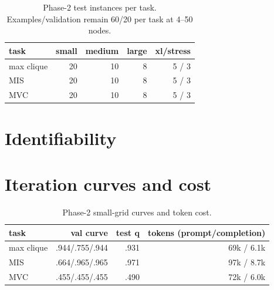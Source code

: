 \documentclass[10pt]{article}
\begin{document}
\begin{table}[H]
\centering
\small

\caption{Phase-1 splits.}
\end{table}

\begin{table}[H]
\centering
\small
\begin{tabular}{lrrrr}
\toprule
task & small & medium & large & xl/stress \\
\midrule
max clique & 20 & 10 & 8 & 5 / 3 \\
MIS & 20 & 10 & 8 & 5 / 3 \\
MVC & 20 & 10 & 8 & 5 / 3 \\
\bottomrule
\end{tabular}
\caption{Phase-2 test instances per task. Examples/validation remain 60/20
per task at 4--50 nodes.}
\end{table}

\section{Identifiability}
\begin{table}[H]
\centering
\small

\caption{Probability that the true task is the unique survivor among 10 tasks
and 37 distractors (400 trials).}
\end{table}

\section{Iteration curves and cost}
\begin{table}[H]
\centering
\small
\begin{tabular}{lrrr}
\toprule
task & val curve & test q & tokens (prompt/completion) \\
\midrule
max clique & .944/.755/.944 & .931 & 69k / 6.1k \\
MIS & .664/.965/.965 & .971 & 97k / 8.7k \\
MVC & .455/.455/.455 & .490 & 72k / 6.0k \\
\bottomrule
\end{tabular}
\caption{Phase-2 small-grid curves and token cost.}
\end{table}
\end{document}
